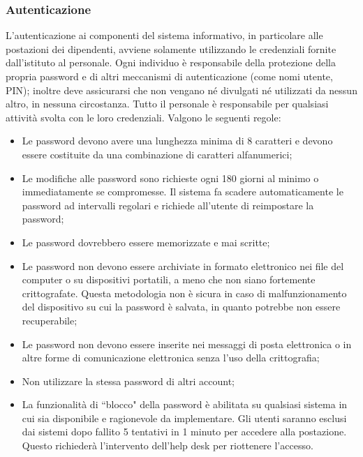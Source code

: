 \documentclass[12pt, a4paper, titlepage]{report}
\begin{document}
			\subsubsection{Autenticazione}
			L'autenticazione ai componenti del sistema informativo, in particolare alle postazioni dei dipendenti, avviene solamente utilizzando le credenziali fornite dall'istituto al personale. Ogni individuo è responsabile della protezione della propria password e di altri meccanismi di autenticazione (come nomi utente, PIN); inoltre deve assicurarsi che non vengano né divulgati né utilizzati da nessun altro, in nessuna circostanza. Tutto il personale è responsabile per qualsiasi attività svolta con le loro credenziali.
			Valgono le seguenti regole:
			\begin{itemize}
				\item Le password devono avere una lunghezza minima di 8 caratteri e devono essere costituite da una combinazione di caratteri alfanumerici;
				\item Le modifiche alle password sono richieste ogni 180 giorni al minimo o immediatamente se compromesse. Il sistema fa scadere automaticamente le password ad intervalli regolari e richiede all'utente di reimpostare la password;
				\item Le password dovrebbero essere memorizzate e mai scritte;
				\item Le password non devono essere archiviate in formato elettronico nei file del computer o su dispositivi portatili, a meno che non siano fortemente crittografate. Questa metodologia non è sicura in caso di malfunzionamento del dispositivo su cui la password è salvata, in quanto potrebbe non essere recuperabile;
				\item Le password non devono essere inserite nei messaggi di posta elettronica o in altre forme di comunicazione elettronica senza l'uso della crittografia;
				\item Non utilizzare la stessa password di altri account;
				\item La funzionalità di ``blocco" della password è abilitata su qualsiasi sistema in cui sia disponibile e ragionevole da implementare. Gli utenti saranno esclusi dai sistemi dopo fallito 5 tentativi in 1 minuto per accedere alla postazione. Questo richiederà l'intervento dell'help desk per riottenere l'accesso.
			\end{itemize}
		
\end{document}
